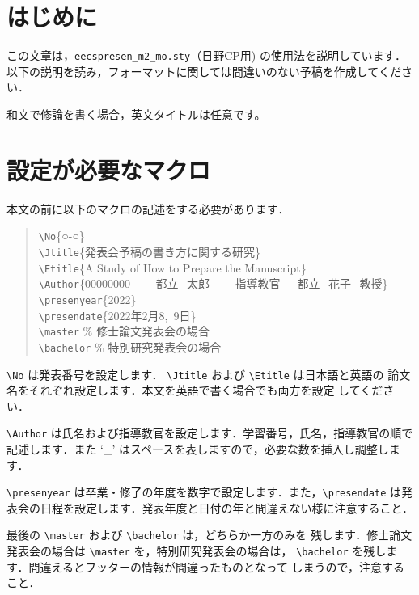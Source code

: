 \documentclass[a4paper]{jarticle}
\begin{document}
\mktitle
%
\renewcommand{\baselinestretch}{1.1}\small
%
\section{はじめに}
この文章は，{\tt eecspresen\_m2\_mo.sty}（日野CP用) の使用法を説明しています．
以下の説明を読み，フォーマットに関しては間違いのない予稿を作成してください．

和文で修論を書く場合，英文タイトルは任意です。

\section{設定が必要なマクロ}

本文の前に以下のマクロの記述をする必要があります．
\newcommand{\tbs}{\textbackslash}
\newcommand{\macrocom}[1]{{\tt \textbackslash#1}}

\begin{quote}
\macrocom{No}\{○-○\}\\
\macrocom{Jtitle}\{発表会予稿の書き方に関する研究\}\\
\macrocom{Etitle}\{A Study of How to Prepare the Manuscript\}\\
\macrocom{Author}\{00000000\_\_\_都立\_太郎\_\_\_指導教官\_\_都立\_花子\_教授\}\\
\macrocom{presenyear}\{2022\}\\
\macrocom{presendate}\{2022年2月8,~9日\}\\%
\macrocom{master}   \% 修士論文発表会の場合\\
\macrocom{bachelor} \% 特別研究発表会の場合
\end{quote}

\macrocom{No} は発表番号を設定します．
\macrocom{Jtitle} および \macrocom{Etitle} は日本語と英語の
論文名をそれぞれ設定します．本文を英語で書く場合でも両方を設定
してください．

\macrocom{Author} は氏名および指導教官を設定します．学習番号，氏名，指導教官の順で
記述します．また `\_' はスペースを表しますので，必要な数を挿入し調整します．

\macrocom{presenyear} は卒業・修了の年度を数字で設定します．また，\macrocom{presendate} 
は発表会の日程を設定します．発表年度と日付の年と間違えない様に注意すること．

最後の \macrocom{master} および \macrocom{bachelor} は，どちらか一方のみを
残します．修士論文発表会の場合は \macrocom{master} を，特別研究発表会の場合は，
\macrocom{bachelor} を残します．間違えるとフッターの情報が間違ったものとなって
しまうので，注意すること．
\end{document}
